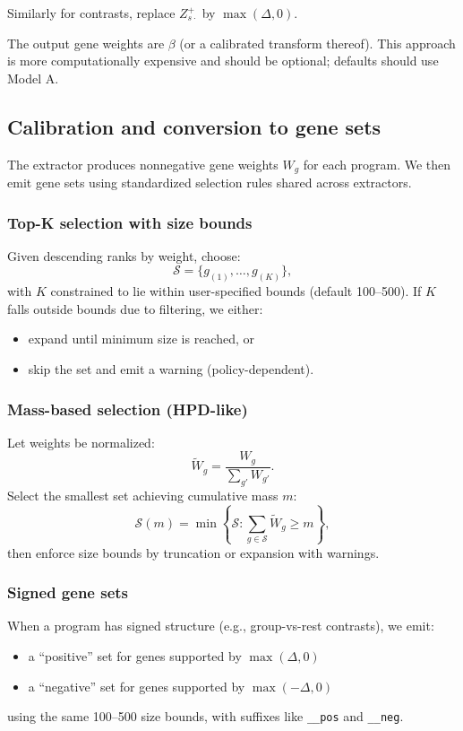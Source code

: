 \documentclass[11pt]{article}
\begin{document}
Similarly for contrasts, replace $Z^+_{s\cdot}$ by $\max(\Delta,0)$.

The output gene weights are $\beta$ (or a calibrated transform thereof). This approach is more computationally expensive and should be optional; defaults should use Model A.

\subsection{Calibration and conversion to gene sets}
The extractor produces nonnegative gene weights $W_g$ for each program. We then emit gene sets using standardized selection rules shared across extractors.

\subsubsection{Top-K selection with size bounds}
Given descending ranks by weight, choose:
\begin{equation}
\mathcal{S} = \{g_{(1)}, \dots, g_{(K)}\},
\end{equation}
with $K$ constrained to lie within user-specified bounds (default 100--500).
If $K$ falls outside bounds due to filtering, we either:
\begin{itemize}
  \item expand until minimum size is reached, or
  \item skip the set and emit a warning (policy-dependent).
\end{itemize}

\subsubsection{Mass-based selection (HPD-like)}
Let weights be normalized:
\begin{equation}
\tilde{W}_g = \frac{W_g}{\sum_{g'} W_{g'}}.
\end{equation}
Select the smallest set achieving cumulative mass $m$:
\begin{equation}
\mathcal{S}(m) = \min\left\{\mathcal{S} : \sum_{g \in \mathcal{S}} \tilde{W}_g \ge m\right\},
\end{equation}
then enforce size bounds by truncation or expansion with warnings.

\subsubsection{Signed gene sets}
When a program has signed structure (e.g., group-vs-rest contrasts), we emit:
\begin{itemize}
  \item a ``positive'' set for genes supported by $\max(\Delta,0)$
  \item a ``negative'' set for genes supported by $\max(-\Delta,0)$
\end{itemize}
using the same 100--500 size bounds, with suffixes like \texttt{\_\_pos} and \texttt{\_\_neg}.
\end{document}
